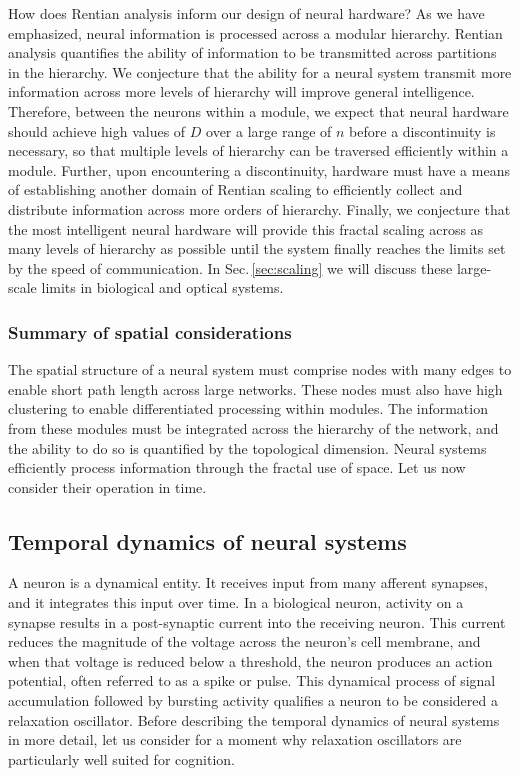 \documentclass[twocolumn]{article}
\begin{document}
How does Rentian analysis inform our design of neural hardware? As we have emphasized, neural information is processed across a modular hierarchy. Rentian analysis quantifies the ability of information to be transmitted across partitions in the hierarchy. We conjecture that the ability for a neural system transmit more information across more levels of hierarchy will improve general intelligence. Therefore, between the neurons within a module, we expect that neural hardware should achieve high values of $D$ over a large range of $n$ before a discontinuity is necessary, so that multiple levels of hierarchy can be traversed efficiently within a module. Further, upon encountering a discontinuity, hardware must have a means of establishing another domain of Rentian scaling to efficiently collect and distribute information across more orders of hierarchy. Finally, we conjecture that the most intelligent neural hardware will provide this fractal scaling across as many levels of hierarchy as possible until the system finally reaches the limits set by the speed of communication. In Sec.\,\ref{sec:scaling} we will discuss these large-scale limits in biological and optical systems.

\subsubsection{Summary of spatial considerations}
The spatial structure of a neural system must comprise nodes with many edges to enable short path length across large networks. These nodes must also have high clustering to enable differentiated processing within modules. The information from these modules must be integrated across the hierarchy of the network, and the ability to do so is quantified by the topological dimension. Neural systems efficiently process information through the fractal use of space. Let us now consider their operation in time.

\subsection{Temporal dynamics of neural systems}
A neuron is a dynamical entity. It receives input from many afferent synapses, and it integrates this input over time. In a biological neuron, activity on a synapse results in a post-synaptic current into the receiving neuron. This current reduces the magnitude of the voltage across the neuron's cell membrane, and when that voltage is reduced below a threshold, the neuron produces an action potential, often referred to as a spike or pulse. This dynamical process of signal accumulation followed by bursting activity qualifies a neuron to be considered a relaxation oscillator. Before describing the temporal dynamics of neural systems in more detail, let us consider for a moment why relaxation oscillators are particularly well suited for cognition.
\end{document}

